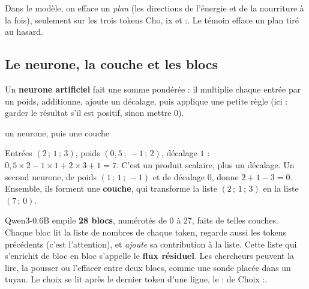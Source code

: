 \documentclass[fontsize=10pt,paper=a4,parskip=half-]{scrartcl}
\newcommand{\q}[1]{\og #1\fg{}}
\begin{document}
Dans le modèle, on efface un \emph{plan} (les directions de l'énergie et de la
nourriture à la fois), seulement sur les trois tokens \q{Cho}, \q{ix} et \q{:}. Le témoin
efface un plan tiré au hasard.

\subsection{Le neurone, la couche et les blocs}
Un \textbf{neurone artificiel} fait une somme pondérée : il multiplie chaque entrée par
un poids, additionne, ajoute un décalage, puis applique une petite règle (ici : garder le
résultat s'il est positif, sinon mettre 0).

\begin{calcul}{un neurone, puis une couche}
\begin{minipage}{0.6\linewidth}
\raggedright
Entrées $(2\,;\,1\,;\,3)$, poids $(0,5\,;\,-1\,;\,2)$, décalage $1$ :
$0,5\times 2 - 1\times 1 + 2\times 3 + 1 = 7$. C'est un produit scalaire, plus un
décalage. Un second neurone, de poids $(1\,;\,1\,;\,-1)$ et de décalage 0, donne
$2+1-3 = 0$. Ensemble, ils forment une \textbf{couche}, qui transforme la liste
$(2\,;\,1\,;\,3)$ en la liste $(7\,;\,0)$.
\end{minipage}\hfill
\begin{minipage}{0.36\linewidth}
\centering
{}
\end{minipage}
\end{calcul}

Qwen3-0.6B empile \textbf{28 blocs}, numérotés de 0 à 27, faits de telles couches. Chaque
bloc lit la liste de nombres de chaque token, regarde aussi les tokens précédents (c'est
\q{l'attention}), et \emph{ajoute} sa contribution à la liste. Cette liste qui s'enrichit de
bloc en bloc s'appelle le \textbf{flux résiduel}. Les chercheurs peuvent la lire, la
pousser ou l'effacer entre deux blocs, comme une sonde placée dans un tuyau. Le choix se
lit après le dernier token d'une ligne, le \q{:} de \q{Choix :}.
\end{document}
